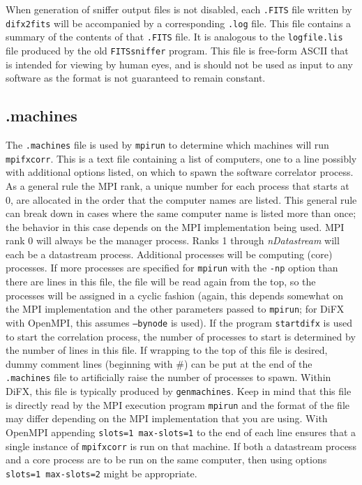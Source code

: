 When generation of sniffer output files is not disabled, each {\tt .FITS} file written by {\tt difx2fits} will be accompanied by a corresponding {\tt .log} file. 
This file contains a summary of the contents of that {\tt .FITS} file.
It is analogous to the {\tt logfile.lis} file produced by the old {\tt FITSsniffer} program.
This file is free-form ASCII that is intended for viewing by human eyes, and is should not be used as input to any software as the format is not guaranteed to remain constant.








\subsection{.machines} \label{sec:machines}

The {\tt .machines} file is used by {\tt mpirun} to determine which machines will run {\tt mpifxcorr}.
This is a text file containing a list of computers, one to a line possibly with additional options listed, on which to spawn the software correlator process.
As a general rule the MPI rank, a unique number for each process that starts at 0, are allocated in the order that the computer names are listed.
This general rule can break down in cases where the same computer name is listed more than once; the behavior in this case depends on the MPI implementation being used.
MPI rank 0 will always be the manager process.
Ranks 1 through {\em nDatastream} will each be a datastream process.
Additional processes will be computing (core) processes.
If more processes are specified for {\tt mpirun} with the {\tt -np} option than there are lines in this file, the file will be read again from the top, so the processes will be assigned in a cyclic fashion (again, this depends somewhat on the MPI implementation and the other parameters passed to {\tt mpirun}; for DiFX with OpenMPI, this assumes {\tt --bynode} is used).
If the program {\tt startdifx} is used to start the correlation process, the number of processes to start is determined by the number of lines in this file.
If wrapping to the top of this file is desired, dummy comment lines (beginning with \#) can be put at the end of the {\tt .machines} file to artificially raise the number of processes to spawn.
Within DiFX, this file is typically produced by {\tt genmachines}.
Keep in mind that this file is directly read by the MPI execution program {\tt mpirun} and the format of the file may differ depending on the MPI implementation that you are using.
With OpenMPI appending {\tt slots=1 max-slots=1} to the end of each line ensures that a single instance of {\tt mpifxcorr} is run on that machine.
If both a datastream process and a core process are to be run on the same computer, then using options {\tt slots=1 max-slots=2} might be appropriate.









